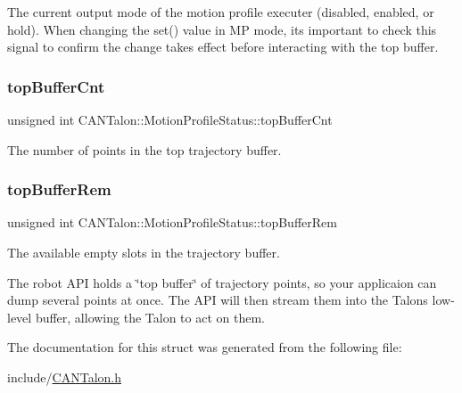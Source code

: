 The current output mode of the motion profile executer (disabled, enabled, or hold). When changing the set() value in MP mode, it\textquotesingle{}s important to check this signal to confirm the change takes effect before interacting with the top buffer. \mbox{\label{struct_c_a_n_talon_1_1_motion_profile_status_a9db6e4d8f570c2dba27269c98418ba41}} 
\subsubsection{\texorpdfstring{top\+Buffer\+Cnt}{topBufferCnt}}
{\footnotesize\ttfamily unsigned int C\+A\+N\+Talon\+::\+Motion\+Profile\+Status\+::top\+Buffer\+Cnt}

The number of points in the top trajectory buffer. \mbox{\label{struct_c_a_n_talon_1_1_motion_profile_status_a1042c720d455cede10218449f64946fa}} 
\subsubsection{\texorpdfstring{top\+Buffer\+Rem}{topBufferRem}}
{\footnotesize\ttfamily unsigned int C\+A\+N\+Talon\+::\+Motion\+Profile\+Status\+::top\+Buffer\+Rem}

The available empty slots in the trajectory buffer.

The robot A\+PI holds a \char`\"{}top buffer\char`\"{} of trajectory points, so your applicaion can dump several points at once. The A\+PI will then stream them into the Talon\textquotesingle{}s low-\/level buffer, allowing the Talon to act on them. 

The documentation for this struct was generated from the following file\+:\begin{DoxyCompactItemize}
\item 
include/\hyperlink{_c_a_n_talon_8h}{C\+A\+N\+Talon.\+h}\end{DoxyCompactItemize}
